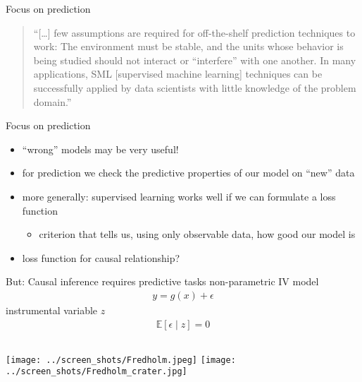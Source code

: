 \documentclass[xcolor=dvipsnames]{beamer}
\newcommand{\E}{\mathbb{E}}
\begin{document}
\begin{frame}{Focus on prediction}
\begin{quote}
``[\dots] few assumptions are required for off-the-shelf prediction techniques to work: The environment must be stable, and the units whose behavior is being studied should not interact or ``interfere'' with one another. In many applications, SML [supervised machine learning] techniques can be successfully applied by data scientists with little knowledge of the problem domain.'' \parencite{athey2017beyond}
\end{quote}
\end{frame}

\begin{frame}{Focus on prediction}
\begin{itemize}
  \item ``wrong'' models may be very useful!
  \pause\item for prediction we check the predictive properties of our model on ``new'' data
  \pause\item more generally: supervised learning works well if we can formulate a loss function
  \begin{itemize}
    \item criterion that tells us, using only observable data, how good our model is
  \end{itemize}
  \item loss function for causal relationship?
\end{itemize}
\end{frame}

\begin{frame}{But: Causal inference requires predictive tasks}
non-parametric IV model \parencite{newey2003instrumental}
\begin{align*}
  y = g(x) + \epsilon
\end{align*}
instrumental variable $z$ 
\begin{align*}
  \E[\epsilon \mid z] = 0
\end{align*}
\end{frame}


\begin{frame}
\begin{columns}[t, onlytextwidth]
    \texttt{[image: ../screen\_shots/Fredholm.jpeg]}
    \texttt{[image: ../screen\_shots/Fredholm\_crater.jpg]}
\end{columns}
\end{frame}
\end{document}
